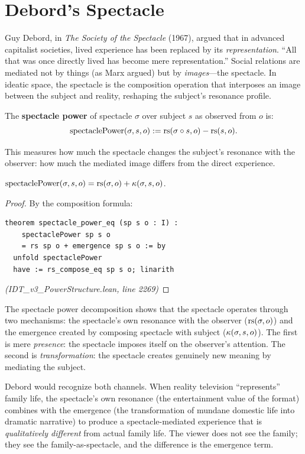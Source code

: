 \section{Debord's Spectacle}

Guy Debord, in \emph{The Society of the Spectacle} (1967), argued that in
advanced capitalist societies, lived experience has been replaced by its
\emph{representation}. ``All that was once directly lived has become mere
representation.'' Social relations are mediated not by things (as Marx argued)
but by \emph{images}---the spectacle. In ideatic space, the spectacle is the
composition operation that interposes an image between the subject and reality,
reshaping the subject's resonance profile.

\begin{definition}
\label{def:spectacle}
The \textbf{spectacle power} of spectacle $\sigma$ over subject $s$ as
observed from $o$ is:
\[
  \mathrm{spectaclePower}(\sigma, s, o) := \mathrm{rs}(\sigma \circ s, o) - \mathrm{rs}(s, o).
\]
\end{definition}

This measures how much the spectacle changes the subject's resonance with the
observer: how much the mediated image differs from the direct experience.

\begin{theorem}
\label{thm:spectacle-decomp}
$\mathrm{spectaclePower}(\sigma, s, o) = \mathrm{rs}(\sigma, o) + \kappa(\sigma, s, o)$.
\end{theorem}

\begin{proof}
By the composition formula:
\begin{lstlisting}
theorem spectacle_power_eq (sp s o : I) :
    spectaclePower sp s o
    = rs sp o + emergence sp s o := by
  unfold spectaclePower
  have := rs_compose_eq sp s o; linarith
\end{lstlisting}
\textit{(IDT\_v3\_PowerStructure.lean, line 2269)}
\end{proof}

\begin{remark}
The spectacle power decomposition shows that the spectacle operates through
two mechanisms: the spectacle's own resonance with the observer ($\mathrm{rs}(\sigma, o)$)
and the emergence created by composing spectacle with subject
($\kappa(\sigma, s, o)$). The first is mere \emph{presence}: the spectacle
imposes itself on the observer's attention. The second is \emph{transformation}:
the spectacle creates genuinely new meaning by mediating the subject.

Debord would recognize both channels. When reality television ``represents''
family life, the spectacle's own resonance (the entertainment value of the
format) combines with the emergence (the transformation of mundane domestic
life into dramatic narrative) to produce a spectacle-mediated experience that
is \emph{qualitatively different} from actual family life. The viewer does not
see the family; they see the family-as-spectacle, and the difference is the
emergence term.
\end{remark}

